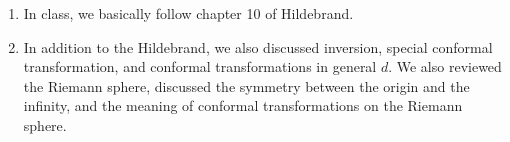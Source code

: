 {\begin{enumerate}
\begin{itemize}
	\item a divisible algebra over real numbers
	\item closed under algebra ($n^{\text{th}}$ order polynomial has $n$ roots)
	\item commutative  
\end{itemize}
\item In class, we basically follow chapter 10 of Hildebrand.
\item In addition to the Hildebrand, we also discussed inversion, special conformal transformation, and conformal transformations in general $d$. We also reviewed the Riemann sphere, discussed the symmetry between the origin and the infinity, and the meaning of conformal transformations on the Riemann sphere. 
\end{enumerate}
}


